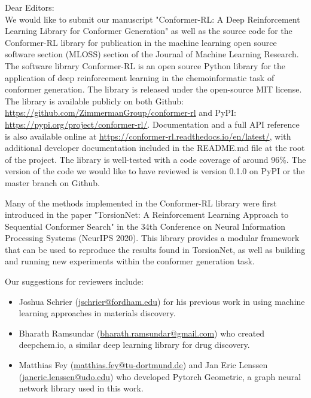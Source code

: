 \documentclass[twoside,11pt]{article}
\begin{document}
    \noindent Dear Editors: \\
    
    We would like to submit our manuscript "Conformer-RL: A Deep Reinforcement Learning Library for Conformer Generation" as well as the source code for the Conformer-RL library for publication in the machine learning open source software section (MLOSS) section of the Journal of Machine Learning Research. The software library Conformer-RL is an open source Python library for the application of deep reinforcement learning in the chemoinformatic task of conformer generation. The library is released under the open-source MIT license. The library is available publicly on both Github: \url{https://github.com/ZimmermanGroup/conformer-rl} and PyPI: \url{https://pypi.org/project/conformer-rl/}. Documentation and a full API reference is also available online at \url{https://conformer-rl.readthedocs.io/en/latest/}, with additional developer documentation included in the README.md file at the root of the project. The library is well-tested with a code coverage of around 96\%. The version of the code we would like to have reviewed is version 0.1.0 on PyPI or the master branch on Github. 
    
    \medskip

    Many of the methods implemented in the Conformer-RL library were first introduced in the paper "TorsionNet: A Reinforcement Learning Approach to Sequential Conformer Search" in the 34th Conference on Neural Information Processing Systems (NeurIPS 2020). This library provides a modular framework that can be used to reproduce the results found in TorsionNet, as well as building and running new experiments within the conformer generation task.

    \medskip
    
    Our suggestions for reviewers include:
    \begin{itemize}
        \item Joshua Schrier (\url{jschrier@fordham.edu}) for his previous work in using machine learning approaches in materials discovery.
        \item Bharath Ramsundar (\url{bharath.ramsundar@gmail.com}) who created deepchem.io, a similar deep learning library for drug discovery.
        \item Matthias Fey (\url{matthias.fey@tu-dortmund.de}) and Jan Eric Lenssen (\url{janeric.lenssen@udo.edu}) who developed Pytorch Geometric, a graph neural network library used in this work.
    \end{itemize}
\end{document}
